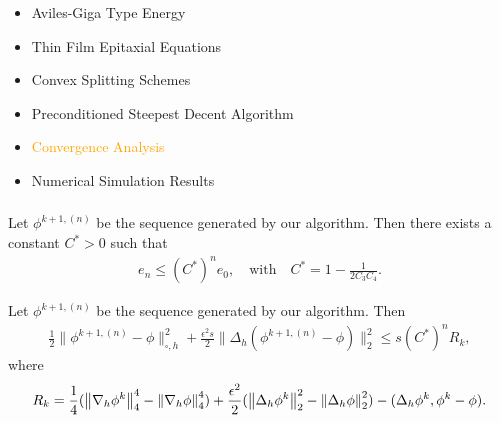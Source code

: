 \documentclass[amstex]{beamer}
\newcommand{\wuhao}{\fontsize{10.5pt}{\baselineskip}\selectfont}    %
\begin{document}
\begin{CJK*}{GBK}{kai}
\begin{frame}
	\begin{itemize}%
		\item \textcolor{orange!10}{Aviles-Giga Type Energy}
		\item \textcolor{orange!10}{Thin Film Epitaxial Equations}
		\item \textcolor{orange!10}{Convex Splitting Schemes}
		\item \textcolor{orange!10}{Preconditioned Steepest Decent Algorithm}
		\item \textcolor{orange}{Convergence Analysis}
		\item \textcolor{orange!10}{Numerical Simulation Results}
	\end{itemize}
\end{frame}
\begin{frame}
	\frametitle{\wuhao{\bf Convergence Analysis}}
	\begin{theorem} \label{theorem:convergence}
Let $\phi^{k+1,(n)}$ be the sequence generated by our algorithm. Then there exists a constant $C^*>0$ such that
\begin{eqnarray*}
e_n \leq (C^*)^n e_0 ,  \quad \mbox{with} \quad  C^* = 1 - \frac{1}{2 C_3 C_4} .  
 \label{error convergence-0}
\end{eqnarray*}
\end{theorem}
\begin{corollary}\label{cor:phicov}
  Let $\phi^{k+1,(n)}$ be the sequence generated by our algorithm. Then 
  {\scriptsize\begin{eqnarray*} 
    \frac12 \| \phi^{k+1,(n)} - \phi \|_{\square,h}^2 + \frac{\epsilon^2 s}{2} \| \Delta_h (\phi^{k+1,(n)} - \phi) \|_2^2 \le s ( C^*)^n R_k, \label{error-phi-2}   
  \end{eqnarray*}}
  where 
  {\scriptsize\begin{eqnarray*}
   R_k  = \frac14 ( \left\|\nabla_h \phi^k\right\|_4^4 - \left\|\nabla_h \phi\right\|_4^4 )
      +\frac{\epsilon^2}{2} ( \left\|\Delta_h \phi^k\right\|_2^2  - \left\|\Delta_h \phi\right\|_2^2 )
      - ( \Delta_h \phi^k , \phi^k - \phi ).
  \end{eqnarray*}}
\end{corollary}

\end{frame}
\end{CJK*}
\end{document}
